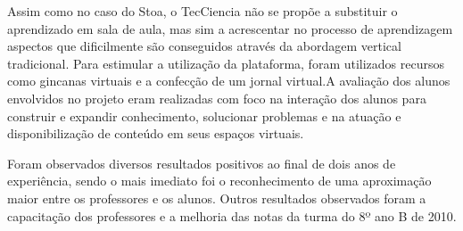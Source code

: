 Assim como no caso do Stoa, o TecCiencia não se propõe a substituir o aprendizado
em sala de aula, mas sim a acrescentar no processo de aprendizagem aspectos que
dificilmente são conseguidos através da abordagem vertical tradicional. Para
estimular a utilização da plataforma, foram utilizados recursos como gincanas
virtuais e a confecção de um jornal virtual.A avaliação dos alunos envolvidos no
projeto eram realizadas com foco na interação dos alunos para construir e expandir
conhecimento, solucionar problemas e na atuação e disponibilização de conteúdo
em seus espaços virtuais.

Foram observados diversos resultados positivos ao final de dois anos de
experiência, sendo o mais imediato foi o reconhecimento de uma aproximação maior
entre os professores e os alunos. Outros resultados observados foram a
capacitação dos professores e a melhoria das notas da turma do 8º ano B de 2010. 
